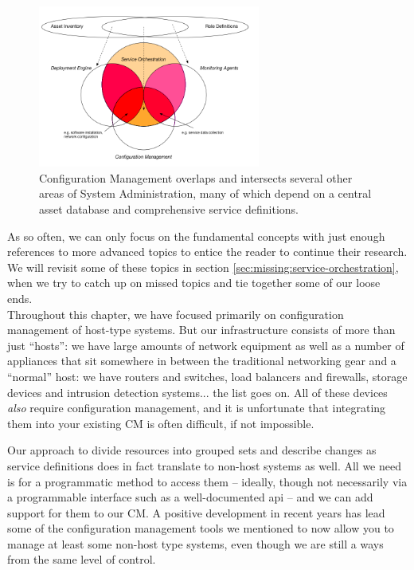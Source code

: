 \begin{figure}[!t]
	\centering
	\includegraphics[width=0.65\textwidth]{07/pics/config-management-overlap}
		\caption[Configuration Management Overlap with other systems]{
			Configuration Management overlaps and
			intersects several other areas
			of System Administration, many
			of which depend on a central asset database and
			comprehensive service definitions.
			\label{fig:configuration-management:cm-overlap}}
\end{figure}

As so often, we can only focus on the fundamental
concepts with just enough references to more advanced
topics to entice the reader to continue their
research. We will revisit some of these topics in
section \ref{sec:missing:service-orchestration}, when
we try to catch up on missed topics and tie together
some of our loose ends. \\

Throughout this chapter, we have focused primarily on
configuration management of host-type systems.  But
our infrastructure consists of more than just
``hosts'': we have large amounts of network
equipment as well as a number of appliances that sit
somewhere in between the traditional networking gear
and a ``normal'' host: we have routers and switches,
load balancers and firewalls, storage devices and
intrusion detection systems... the list goes on.  All
of these devices {\em also} require configuration
management, and it is unfortunate that integrating
them into your existing CM is often difficult, if not
impossible.

Our approach to divide resources into grouped sets and
describe changes as service definitions does in fact
translate to non-host systems as well.  All we need is
for a programmatic method to access them -- ideally,
though not necessarily via a programmable interface
such as a well-documented \gls{api} -- and we can add
support for them to our CM.  A positive development in
recent years has lead some of the configuration
management tools we mentioned to now allow you to
manage at least some non-host type systems, even
though we are still a ways from the same level of
control.  \\

